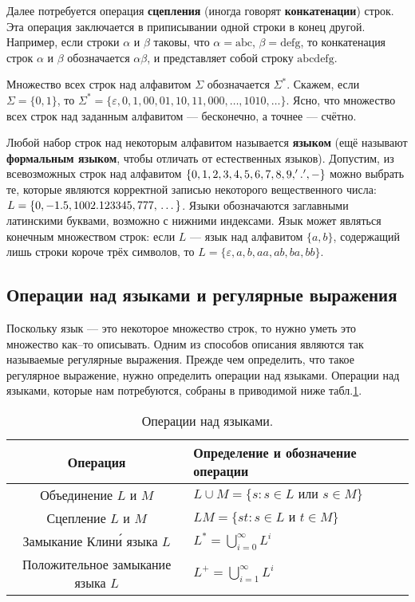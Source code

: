 \documentclass[12pt]{article}
\begin{document}
Далее потребуется операция \textbf{сцепления} (иногда говорят \textbf{конкатенации}) строк. Эта операция заключается в приписывании одной строки в конец другой. Например, если строки $\alpha$ и $\beta$ таковы, что $\alpha=\text{abc}$, $\beta=\text{defg}$,
то конкатенация строк $\alpha$ и $\beta$ обозначается $\alpha\beta$, и представляет собой строку $\text{abcdefg}$.

Множество всех строк над алфавитом $\Sigma$ обозначается $\Sigma^*$. Скажем, если $\Sigma=\{0,1\}$, то $\Sigma^*=\{\varepsilon,0,1,00,01,10,11,000,\dots,1010,\dots\}$. Ясно, что множество всех строк над заданным алфавитом --- бесконечно, а точнее --- счётно.

Любой набор строк над некоторым алфавитом называется \textbf{языком} (ещё называют \textbf{формальным языком}, чтобы отличать от естественных языков). Допустим, из всевозможных строк над алфавитом $\{0,1,2,\\ 3,4,5,6,7,8,9,'.',-\}$ можно выбрать те, которые являются корректной записью некоторого вещественного числа: $L=\{0,-1.5,1002.123345,777,\\ \dots\}$. Языки обозначаются заглавными латинскими буквами, возможно с нижними индексами. Язык может являться конечным множеством строк: если $L$ --- язык над алфавитом $\{a,b\}$, содержащий лишь строки короче трёх символов, то $L=\{\varepsilon,a,b,aa,ab,ba,bb\}$.
	\subsection{Операции над языками и регулярные выражения}

Поскольку язык --- это некоторое множество строк, то нужно уметь это множество как--то описывать. Одним из способов описания являются так называемые регулярные выражения. Прежде чем определить, что такое регулярное выражение, нужно определить операции над языками. Операции над языками, которые нам потребуются, собраны в приводимой ниже табл.\ref{langops!table}.	\newpage


\begin{table}[!h]\label{langops!table}	
\centering
\vspace{1mm}
\caption{Операции над языками.}
\begin{tabular}{|c|p{70mm}|}\hline
Операция 		                                      & Определение и обозначение операции \\ \hline
Объединение $L$ и $M$                              & $L\cup M=\{s: s\in L\text{ или }s\in M\}$   \\ \hline
Сцепление $L$ и $M$                                    & $LM=\{st: s\in L\text{ и }t\in M\}$                 \\ \hline
Замыкание Клин\'{и} языка $L$                & $L^*=\bigcup\limits_{i=0}^\infty L^i$         \\ \hline
Положительное замыкание языка $L$  & $L^+=\bigcup\limits_{i=1}^\infty L^i$         \\ \hline
\end{tabular}
\end{table}
\end{document}
